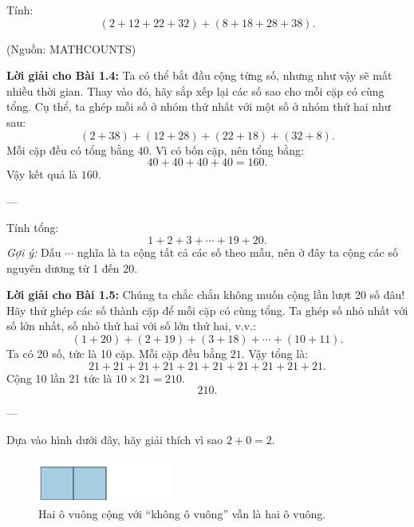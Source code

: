 \begin{problem}[1.4]
Tính:
\[
(2 + 12 + 22 + 32) + (8 + 18 + 28 + 38).
\]
\begin{flushright}\small(Nguồn: MATHCOUNTS)\end{flushright}
\end{problem}

\noindent\textbf{Lời giải cho Bài 1.4:}  
Ta có thể bắt đầu cộng từng số, nhưng như vậy sẽ mất nhiều thời gian.  
Thay vào đó, hãy sắp xếp lại các số sao cho mỗi cặp có cùng tổng.  
Cụ thể, ta ghép mỗi số ở nhóm thứ nhất với một số ở nhóm thứ hai như sau:
\[
(2 + 38) + (12 + 28) + (22 + 18) + (32 + 8).
\]
Mỗi cặp đều có tổng bằng \(40\).  
Vì có bốn cặp, nên tổng bằng:
\[
40 + 40 + 40 + 40 = 160.
\]
Vậy kết quả là \(\boxed{160}.\)
\medskip

---

\begin{problem}[1.5]
Tính tổng:
\[
1 + 2 + 3 + \cdots + 19 + 20.
\]
\textit{Gợi ý:} Dấu \texttt{$\cdots$} nghĩa là ta cộng tất cả các số theo mẫu,  
nên ở đây ta cộng các số nguyên dương từ 1 đến 20.
\end{problem}

\noindent\textbf{Lời giải cho Bài 1.5:}  
Chúng ta chắc chắn không muốn cộng lần lượt 20 số đâu!  
Hãy thử ghép các số thành cặp để mỗi cặp có cùng tổng.  
Ta ghép số nhỏ nhất với số lớn nhất, số nhỏ thứ hai với số lớn thứ hai, v.v.:
\[
(1 + 20) + (2 + 19) + (3 + 18) + \cdots + (10 + 11).
\]
Ta có 20 số, tức là 10 cặp.  
Mỗi cặp đều bằng \(21\).  
Vậy tổng là:
\[
21 + 21 + 21 + 21 + 21 + 21 + 21 + 21 + 21 + 21.
\]
Cộng 10 lần 21 tức là \(10 \times 21 = 210.\)
\[
\boxed{210}.
\]

---

\begin{problem}[1.6]
Dựa vào hình dưới đây, hãy giải thích vì sao \(2 + 0 = 2.\)

\begin{figure}[ht!]
  \centering
  \includegraphics[width=0.4\textwidth]{img/fig-prob1.6.pdf}
  \caption*{\small Hai ô vuông cộng với “không ô vuông” vẫn là hai ô vuông.}
\end{figure}
\end{problem}

